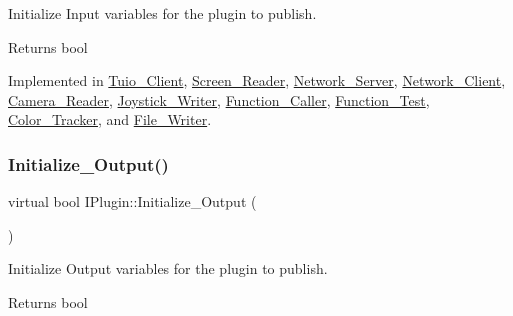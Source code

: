 Initialize Input variables for the plugin to publish. 

\begin{DoxyReturn}{Returns}
bool 
\end{DoxyReturn}


Implemented in \hyperlink{class_tuio___client_a66bd1d9dc23405e7589d899ef6c5d892}{Tuio\+\_\+\+Client}, \hyperlink{class_screen___reader_a40c7e767ec368074d63ba4d4e5e3e0bc}{Screen\+\_\+\+Reader}, \hyperlink{class_network___server_ad5129bb2f3bcf2480a33a42a36cd5352}{Network\+\_\+\+Server}, \hyperlink{class_network___client_a429b34311701bc58b617c7e0675e70fa}{Network\+\_\+\+Client}, \hyperlink{class_camera___reader_aa4870916d311618a5b6513f12c3e125b}{Camera\+\_\+\+Reader}, \hyperlink{class_joystick___writer_a4f7355cdbd819e5ce41575e152c98660}{Joystick\+\_\+\+Writer}, \hyperlink{class_function___caller_a9b879313b891d3e60b105f94e3fd71cf}{Function\+\_\+\+Caller}, \hyperlink{class_function___test_a4d937dda611ec1b3bbdd70cdad6d76d2}{Function\+\_\+\+Test}, \hyperlink{class_color___tracker_afc447223ab3c357e66530b08acd8daea}{Color\+\_\+\+Tracker}, and \hyperlink{class_file___writer_a13697d8b3249804553ef61a54fea5ce1}{File\+\_\+\+Writer}.

\mbox{\label{class_i_plugin_a0b772513fc8c4ed01240e19c4bb84068}} 
\subsubsection{\texorpdfstring{Initialize\+\_\+\+Output()}{Initialize\_Output()}}
{\footnotesize\ttfamily virtual bool I\+Plugin\+::\+Initialize\+\_\+\+Output (\begin{DoxyParamCaption}{ }\end{DoxyParamCaption})\hspace{0.3cm}{\ttfamily [pure virtual]}}



Initialize Output variables for the plugin to publish. 

\begin{DoxyReturn}{Returns}
bool 
\end{DoxyReturn}


